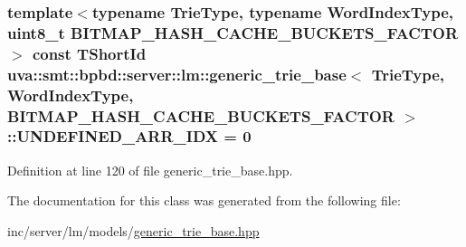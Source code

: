 \subsubsection[{U\+N\+D\+E\+F\+I\+N\+E\+D\+\_\+\+A\+R\+R\+\_\+\+I\+D\+X}]{\setlength{\rightskip}{0pt plus 5cm}template$<$typename Trie\+Type, typename Word\+Index\+Type, uint8\+\_\+t B\+I\+T\+M\+A\+P\+\_\+\+H\+A\+S\+H\+\_\+\+C\+A\+C\+H\+E\+\_\+\+B\+U\+C\+K\+E\+T\+S\+\_\+\+F\+A\+C\+T\+O\+R$>$ const {\bf T\+Short\+Id} {\bf uva\+::smt\+::bpbd\+::server\+::lm\+::generic\+\_\+trie\+\_\+base}$<$ Trie\+Type, {\bf Word\+Index\+Type}, B\+I\+T\+M\+A\+P\+\_\+\+H\+A\+S\+H\+\_\+\+C\+A\+C\+H\+E\+\_\+\+B\+U\+C\+K\+E\+T\+S\+\_\+\+F\+A\+C\+T\+O\+R $>$\+::U\+N\+D\+E\+F\+I\+N\+E\+D\+\_\+\+A\+R\+R\+\_\+\+I\+D\+X = 0\hspace{0.3cm}{\ttfamily [static]}}\label{classuva_1_1smt_1_1bpbd_1_1server_1_1lm_1_1generic__trie__base_a3e961dc1d0e7bd38134573227f818b8b}


Definition at line 120 of file generic\+\_\+trie\+\_\+base.\+hpp.



The documentation for this class was generated from the following file\+:\begin{DoxyCompactItemize}
\item 
inc/server/lm/models/\hyperlink{generic__trie__base_8hpp}{generic\+\_\+trie\+\_\+base.\+hpp}\end{DoxyCompactItemize}
